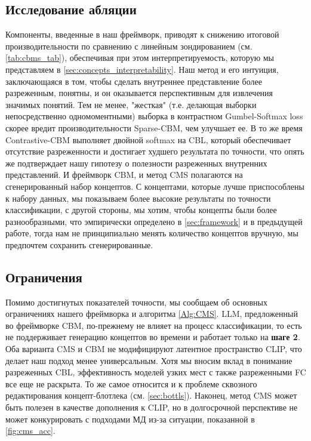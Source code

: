 \subsection{Исследование абляции}\label{sec:abl}
Компоненты, введенные в наш фреймворк, приводят к снижению итоговой производительности по сравнению с линейным зондированием (см. \cref{tab:cbms_tab}), обеспечивая при этом интерпретируемость, которую мы представляем в \cref{sec:concepts_interpretability}. Наш метод и его интуиция, заключающаяся в том, чтобы сделать внутреннее представление более разреженным, понятны, и он оказывается перспективным для извлечения значимых понятий. Тем не менее, "жесткая" (т.е. делающая выборки непосредственно одномоментными) выборка в контрастном Gumbel-Softmax loss скорее вредит производительности Sparse-CBM, чем улучшает ее. В то же время Contrastive-CBM выполняет двойной softmax на CBL, который обеспечивает отсутствие разреженности и достигает худшего результата по точности, что опять же подтверждает нашу гипотезу о полезности разреженных внутренних представлений. И фреймворк CBM, и метод CMS полагаются на сгенерированный набор концептов. С концептами, которые лучше приспособлены к набору данных, мы показываем более высокие результаты по точности классификации, с другой стороны, мы хотим, чтобы концепты были более разнообразными, что эмпирически определено в \cref{sec:framework} и в предыдущей \cite{oikarinen2023labelfree} работе, тогда нам не принципиально менять количество концептов вручную, мы предпочтем сохранить сгенерированные.

\subsection{Ограничения}\label{sec:lims}

Помимо достигнутых показателей точности, мы сообщаем об основных ограничениях нашего фреймворка и алгоритма \ref{Alg:CMS}. LLM, предложенный во фреймворке CBM, по-прежнему не влияет на процесс классификации, то есть не поддерживает генерацию концептов во времени и работает только на \textbf{шаге 2}. Оба варианта CMS и CBM не модифицируют латентное пространство CLIP, что делает наш подход менее универсальным. Хотя мы вносим вклад в понимание разреженных CBL, эффективность моделей узких мест с также разреженными FC все еще не раскрыта. То же самое относится и к проблеме сквозного редактирования концепт-блотлека (см. \cref{sec:bottls}). Наконец, метод CMS может быть полезен в качестве дополнения к CLIP, но в долгосрочной перспективе не может конкурировать с подходами МД из-за ситуации, показанной в \cref{fig:cms_acc}.   
\nocite{JMLR:v9:vandermaaten08a}